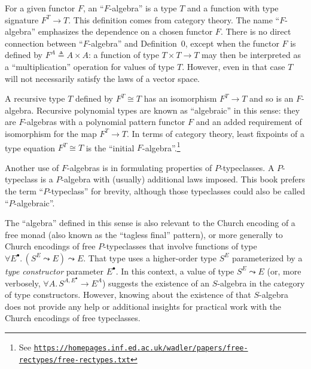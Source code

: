 For a given functor $F$, an \textsf{``}$F$-algebra\textsf{''}
is a type $T$ and a function with type signature $F^{T}\rightarrow T$.
This definition comes from category theory. The name \textsf{``}$F$-algebra\textsf{''}
emphasizes the dependence on a chosen functor $F$. There is no direct
connection between \textsf{``}$F$-algebra\textsf{''} and Definition~0, except when
the functor $F$ is defined by $F^{A}\triangleq A\times A$: a function
of type $T\times T\rightarrow T$ may then be interpreted as a \textsf{``}multiplication\textsf{''}
operation for values of type $T$. However, even in that case $T$
will not necessarily satisfy the laws of a vector space.

A recursive type $T$ defined by $F^{T}\cong T$ has an isomorphism
$F^{T}\rightarrow T$ and so is an $F$-algebra. Recursive polynomial
types are known as \textsf{``}algebraic\textsf{''} in this sense: they are $F$-algebras
with a polynomial pattern functor $F$ and an added requirement of
isomorphism for the map $F^{T}\rightarrow T$. In terms of category
theory, least fixpoints of a type equation $F^{T}\cong T$ is the
\textsf{``}initial $F$-algebra\textsf{''}.\footnote{See \texttt{\href{https://homepages.inf.ed.ac.uk/wadler/papers/free-rectypes/free-rectypes.txt}{https://homepages.inf.ed.ac.uk/wadler/papers/free-rectypes/free-rectypes.txt}} }

Another use of $F$-algebras is in formulating properties of $P$-typeclasses.
A $P$-typeclass is a $P$-algebra with (usually) additional laws
imposed. This book prefers the term \textsf{``}$P$-typeclass\textsf{''} for brevity,
although those typeclasses could also be called \textsf{``}$P$-algebraic\textsf{''}.

The \textsf{``}algebra\textsf{''} defined in this sense is also relevant to the Church
encoding of a free monad (also known as the \textsf{``}tagless final\textsf{''}
pattern), or more generally to Church encodings of free $P$-typeclasses
that involve functions of type $\forall E^{\bullet}.\,(S^{E}\leadsto E)\leadsto E$.
That type uses a higher-order type $S^{E}$ parameterized by a \emph{type
constructor} parameter $E^{\bullet}$. In this context, a value of
type $S^{E}\leadsto E$ (or, more verbosely, $\forall A.\,S^{A,E^{\bullet}}\rightarrow E^{A}$)
suggests the existence of an $S$-algebra in the category of type
constructors. However, knowing about the existence of that $S$-algebra
does not provide any help or additional insights for practical work
with the Church encodings of free typeclasses.

